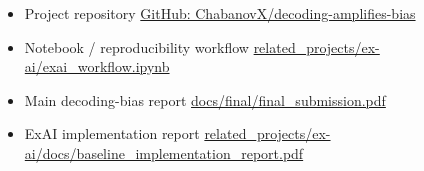 \documentclass[11pt]{article}
\begin{document}
\begin{itemize}
\item Project repository   \href{https://github.com/ChabanovX/decoding-amplifies-bias}{GitHub: ChabanovX/decoding-amplifies-bias}
\end{itemize}

\begin{itemize}
\item Notebook / reproducibility workflow   \href{related_projects/ex-ai/exai_workflow.ipynb}{related\_projects/ex-ai/exai\_workflow.ipynb}
\end{itemize}

\begin{itemize}
\item Main decoding-bias report   \href{docs/final/final_submission.pdf}{docs/final/final\_submission.pdf}
\end{itemize}

\begin{itemize}
\item ExAI implementation report   \href{related_projects/ex-ai/docs/baseline_implementation_report.pdf}{related\_projects/ex-ai/docs/baseline\_implementation\_report.pdf}
\end{itemize}
\end{document}
